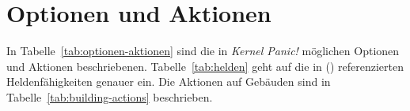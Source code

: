 \section{Optionen und Aktionen}


%
%
%

In Tabelle~\ref{tab:optionen-aktionen} sind die in \emph{Kernel Panic!}
möglichen Optionen und Aktionen beschriebenen. Tabelle~\ref{tab:helden} geht
auf die in () referenzierten Heldenfähigkeiten genauer
ein. Die Aktionen auf Gebäuden sind in Tabelle~\ref{tab:building-actions}
beschrieben.

